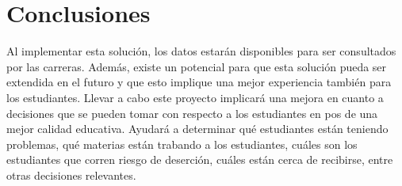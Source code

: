 \section[Conclusiones]{Conclusiones}

Al implementar esta solución, los datos estarán disponibles para ser consultados por las carreras. Además, existe un potencial para que esta solución pueda ser extendida en el futuro y que esto implique una mejor experiencia también para los estudiantes.
Llevar a cabo este proyecto implicará una mejora en cuanto a decisiones que se pueden tomar con respecto a los estudiantes en pos de una mejor calidad educativa. Ayudará a determinar qué estudiantes están teniendo problemas, qué materias están trabando a los estudiantes, cuáles son los estudiantes que corren riesgo de deserción, cuáles están cerca de recibirse, entre otras decisiones relevantes.



